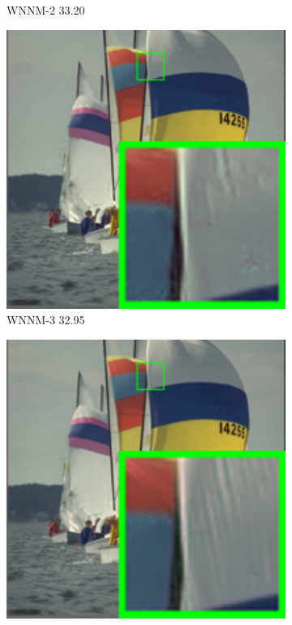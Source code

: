 \begin{figure}
\begin{subfigure}[t]{0.19\textwidth}
		\caption{WNNM-2 33.20}
    \end{subfigure}
    \hfill
    \begin{subfigure}[t]{0.19\textwidth}
        \centering
        \includegraphics[width=1\textwidth]{images/mcwnnm/24images/resize_br_WNNM_ADMM_nSig53015_kodim09.png}
		\caption{WNNM-3 32.95}
    \end{subfigure}
    \hfill
    \begin{subfigure}[t]{0.19\textwidth}
        \centering
        \includegraphics[width=1\textwidth]{images/mcwnnm/24images/resize_br_CWNNM_ADMM_nSig53015_kodim09.png}

\end{subfigure}
\end{figure}
